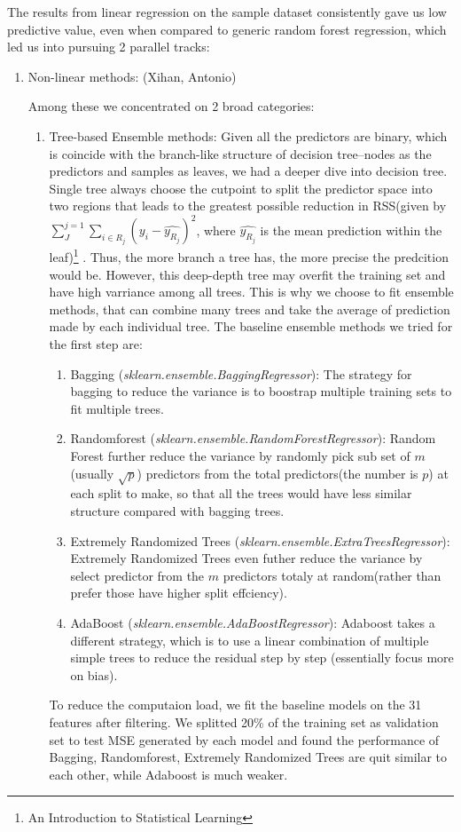 \documentclass[11pt]{article}
\begin{document}
The results from linear regression on the sample dataset consistently gave us low predictive value, even when compared to generic random forest regression, which led us into pursuing 2 parallel tracks:

\begin{enumerate}

\item Non-linear methods: (Xihan, Antonio)

Among these we concentrated on 2 broad categories:

\begin{enumerate}

\item Tree-based Ensemble methods: 
Given all the predictors are binary, which is coincide with the branch-like structure of decision tree--nodes as the predictors and samples as leaves, we had a deeper dive into decision tree. Single tree always choose the cutpoint to split the predictor space into two regions that leads to the greatest possible reduction in RSS(given by $\sum_{J}^{j=1}\sum_{i\in R_{j}}(y_{i}-\hat{y_{R_{j}}})^{2}$, where $\hat{y_{R_{j}}}$ is the mean prediction within the leaf)\footnote{An Introduction to Statistical Learning} . Thus, the more branch a tree has, the more precise the predcition would be. However, this deep-depth tree may overfit the training set and have high varriance among all trees. This is why we choose to fit ensemble methods, that can combine many trees and take the average of prediction made by each individual tree. 
The baseline ensemble methods we tried for the first step are:
\begin{enumerate}
\item Bagging (\emph{sklearn.ensemble.BaggingRegressor}): The strategy for bagging to reduce the variance is to boostrap multiple training sets to fit multiple trees.
\item Randomforest (\emph{sklearn.ensemble.RandomForestRegressor}): Random Forest further reduce the variance by randomly pick sub set of $\mathit{m}$ (usually $\sqrt{p}$) predictors from the total predictors(the number is $\mathit{p}$) at each split to make, so that all the trees would have less similar structure compared with bagging trees.
\item Extremely Randomized Trees (\emph{sklearn.ensemble.ExtraTreesRegressor}): Extremely Randomized Trees even futher reduce the variance by select predictor from the $\mathit{m}$ predictors totaly at random(rather than prefer those have higher split effciency). 
\item AdaBoost (\emph{sklearn.ensemble.AdaBoostRegressor}): Adaboost takes a different strategy, which is to use a linear combination of multiple simple trees to reduce the residual step by step (essentially focus more on bias). 
\end{enumerate}
To reduce the computaion load, we fit the baseline models on the 31 features after filtering. We splitted 20\% of the training set as validation set to test MSE generated by each model and found the performance of Bagging, Randomforest, Extremely Randomized Trees are quit similar to each other, while Adaboost is much weaker. 


\end{enumerate}
\end{enumerate}
\end{document}
